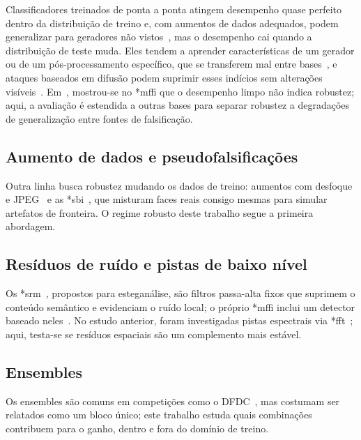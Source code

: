 \documentclass[10pt,conference]{IEEEtran}
\makeatletter
\newcommand{\acr@use}[2]{%
  \@ifundefined{acr@short@#1}{\textbf{??#1??}}{%
    \@ifundefined{acr@used@#1}{%
      \ifnum#2=0 \csname acr@long@#1\endcsname\else\csname acr@longpl@#1\endcsname\fi
      ~(\csname acr@short@#1\endcsname\ifnum#2=1 s\fi)%
      \expandafter\gdef\csname acr@used@#1\endcsname{}%
    }{%
      \csname acr@short@#1\endcsname\ifnum#2=1 s\fi
    }}%
}
\DeclareRobustCommand{\gls}{\@ifstar{\acr@use@s}{\acr@use@s}}
\newcommand{\acr@use@s}[1]{\acr@use{#1}{0}}
\makeatother
\begin{document}
Classificadores treinados de ponta a ponta atingem desempenho quase perfeito dentro da distribuição de treino e, com aumentos de dados adequados, podem generalizar para geradores não vistos~\cite{ref_faceforensics,ref_generalization_gap}, mas o desempenho cai quando a distribuição de teste muda.
Eles tendem a aprender características de um gerador ou de um pós-processamento específico, que se transferem mal entre bases~\cite{ref_sota_detection}, e ataques baseados em difusão podem suprimir esses indícios sem alterações visíveis~\cite{ivanovska2024vulnerability}.
Em~\cite{cunha2026benchmarking}, mostrou-se no \gls*{mffi} que o desempenho limpo não indica robustez; aqui, a avaliação é estendida a outras bases para separar robustez a degradações de generalização entre fontes de falsificação.

\subsection{Aumento de dados e pseudofalsificações}

Outra linha busca robustez mudando os dados de treino: aumentos com desfoque e JPEG~\cite{ref_generalization_gap} e as \gls*{sbi}~\cite{shiohara2022detecting}, que misturam faces reais consigo mesmas para simular artefatos de fronteira.
O regime robusto deste trabalho segue a primeira abordagem.

\subsection{Resíduos de ruído e pistas de baixo nível}

Os \gls*{srm}~\cite{fridrich2012rich}, propostos para esteganálise, são filtros passa-alta fixos que suprimem o conteúdo semântico e evidenciam o ruído local; o próprio \gls*{mffi} inclui um detector baseado neles~\cite{ref_mffi}.
No estudo anterior, foram investigadas pistas espectrais via \gls*{fft}~\cite{frank2020leveraging,dzanic2020fourier,qian2020thinking}; aqui, testa-se se resíduos espaciais são um complemento mais estável.

\subsection{Ensembles}

Os ensembles são comuns em competições como o DFDC~\cite{dolhansky2020deepfake}, mas costumam ser relatados como um bloco único; este trabalho estuda quais combinações contribuem para o ganho, dentro e fora do domínio de treino.
\end{document}
